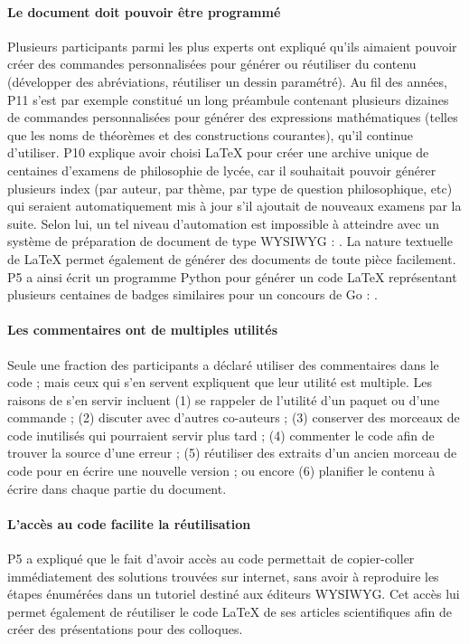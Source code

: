 \paragraph{Le document doit pouvoir être programmé}
Plusieurs participants parmi les plus experts ont expliqué qu'ils aimaient pouvoir créer des commandes personnalisées pour générer ou réutiliser du contenu (\eg développer des abréviations, réutiliser un dessin paramétré).
Au fil des années, P11 s'est par exemple constitué un long préambule contenant plusieurs dizaines de commandes personnalisées pour générer des expressions mathématiques (telles que les noms de théorèmes et des constructions courantes), qu'il continue d'utiliser.
P10 explique avoir choisi \LaTeX{} pour créer une archive unique de centaines d'examens de philosophie de lycée, car il souhaitait pouvoir générer plusieurs index (par auteur, par thème, par type de question philosophique, etc) qui seraient automatiquement mis à jour s'il ajoutait de nouveaux examens par la suite.
Selon lui, un tel niveau d'automation est impossible à atteindre avec un système de préparation de document de type WYSIWYG : .
La nature textuelle de \LaTeX{} permet également de générer des documents de toute pièce facilement.
P5 a ainsi écrit un programme Python pour générer un code \LaTeX{} représentant plusieurs centaines de badges similaires pour un concours de Go : .

\paragraph{Les commentaires ont de multiples utilités}
Seule une fraction des participants a déclaré utiliser des commentaires dans le code ; mais ceux qui s'en servent expliquent que leur utilité est multiple.
Les raisons de s'en servir incluent
(1) se rappeler de l'utilité d'un paquet ou d'une commande ;
(2) discuter avec d'autres co-auteurs ;
(3) conserver des morceaux de code inutilisés qui pourraient servir plus tard ;
(4) commenter le code afin de trouver la source d'une erreur ;
(5) réutiliser des extraits d'un ancien morceau de code pour en écrire une nouvelle version ;
ou encore (6) planifier le contenu à écrire dans chaque partie du document.

\paragraph{L'accès au code facilite la réutilisation}
P5 a expliqué que le fait d'avoir accès au code permettait de copier-coller immédiatement des solutions trouvées sur internet, sans avoir à reproduire les étapes énumérées dans un tutoriel destiné aux éditeurs WYSIWYG.
Cet accès lui permet également de réutiliser le code \LaTeX{} de ses articles scientifiques afin de créer des présentations pour des colloques.



